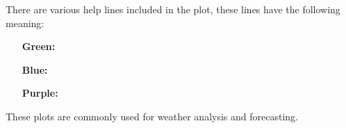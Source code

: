 \documentclass{article}
\begin{document}
There are various help lines included in the plot, these lines have the following meaning:
\begin{enumerate}[leftmargin=2cm]
	\item[\textbf{Green:}]  
	\item[\textbf{Blue:}]   
	\item[\textbf{Purple:}] 
\end{enumerate}

These plots are commonly used for weather analysis and forecasting.




\newpage				%


\end{document}
